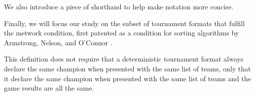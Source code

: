 {    %

    We also introduce a piece of shorthand to help make notation more concise.


    Finally, we will focus our study on the subset of tournament formats that fulfill the \i{network condition}, first patented as a condition for sorting algorithms by Armstrong, Nelson, and O'Connor \cite{pat}.


    This definition does not require that a deterministic tournament format always declare the same champion when presented with the same list of teams, only that it declare the same champion when presented with the same list of teams and the game results are all the same.

}